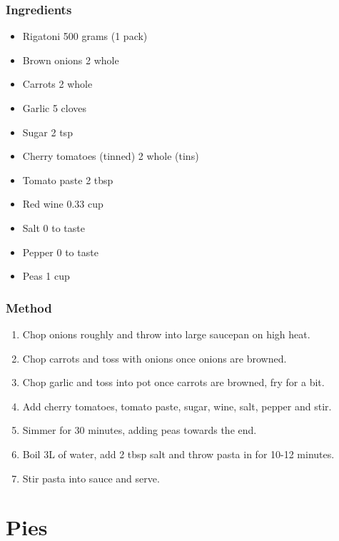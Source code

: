 \documentclass[]{article}
\begin{document}
\subsubsection*{\Large Ingredients}
\begin{multicols}{2}
\begin{itemize}
 \item Rigatoni \hfill 500 grams (1 pack)
 \item Brown onions \hfill 2 whole
 \item Carrots \hfill 2 whole
 \item Garlic \hfill 5 cloves
 \item Sugar \hfill 2 tsp
 \item Cherry tomatoes (tinned) \hfill 2 whole (tins)
 \item Tomato paste \hfill 2 tbsp
 \item Red wine \hfill 0.33 cup
 \item Salt \hfill 0 to taste
 \item Pepper \hfill 0 to taste
 \item Peas \hfill 1 cup
\end{itemize}
\end{multicols}
\subsubsection*{\Large Method}
\begin{enumerate}[font=\huge\color{accent}]
	\item Chop onions roughly and throw into large saucepan on high heat.
	\item Chop carrots and toss with onions once onions are browned.
	\item Chop garlic and toss into pot once carrots are browned, fry for a bit.
	\item Add cherry tomatoes, tomato paste, sugar, wine, salt, pepper and stir.
	\item Simmer for 30 minutes, adding peas towards the end.
	\item Boil 3L of water, add 2 tbsp salt and throw pasta in for 10-12 minutes.
	\item Stir pasta into sauce and serve.
\end{enumerate}
\newpage
{}
\section*{\center\Huge\color{accent}Pies}
\label{cat:Pies}
\label{rec:Base Quiche}
\end{document}
